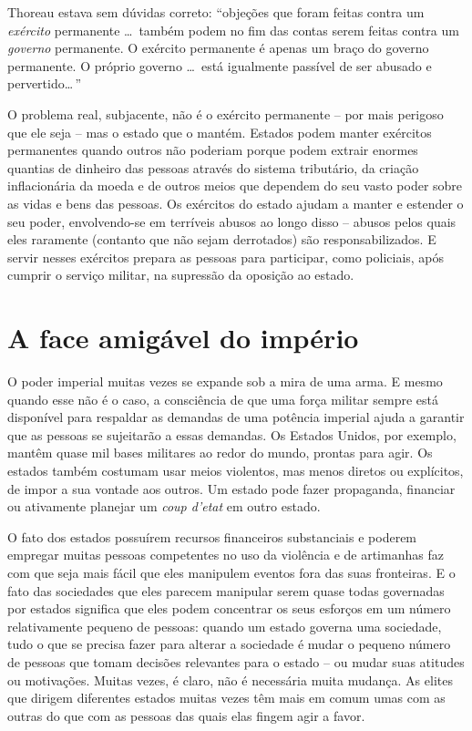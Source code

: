 Thoreau estava sem dúvidas correto: ``objeções que foram feitas contra um \emph{exército} permanente \ldots\ também podem no fim das contas serem feitas contra um \emph{governo} permanente. O exército permanente é apenas um braço do governo permanente. O próprio governo \ldots\ está igualmente passível de ser abusado e pervertido\ldots\,''

O problema real, subjacente, não é o exército permanente -- por mais perigoso que ele seja -- mas o estado que o mantém. Estados podem manter exércitos permanentes quando outros não poderiam porque podem extrair enormes quantias de dinheiro das pessoas através do sistema tributário, da criação inflacionária da moeda e de outros meios que dependem do seu vasto poder sobre as vidas e bens das pessoas. Os exércitos do estado ajudam a manter e estender o seu poder, envolvendo-se em terríveis abusos ao longo disso -- abusos pelos quais eles raramente (contanto que não sejam derrotados) são responsabilizados. E servir nesses exércitos prepara as pessoas para participar, como policiais, após cumprir o serviço militar, na supressão da oposição ao estado.

\section{A face amigável do império}

O poder imperial muitas vezes se expande sob a mira de uma arma. E mesmo quando esse não é o caso, a consciência de que uma força militar sempre está disponível para respaldar as demandas de uma potência imperial ajuda a garantir que as pessoas se sujeitarão a essas demandas. Os Estados Unidos, por exemplo, mantêm quase mil bases militares ao redor do mundo, prontas para agir. Os estados também costumam usar meios violentos, mas menos diretos ou explícitos, de impor a sua vontade aos outros. Um estado pode fazer propaganda, financiar ou ativamente planejar um \emph{coup d'etat} em outro estado.

O fato dos estados possuírem recursos financeiros substanciais e poderem empregar muitas pessoas competentes no uso da violência e de artimanhas faz com que seja mais fácil que eles manipulem eventos fora das suas fronteiras. E o fato das sociedades que eles parecem manipular serem quase todas governadas por estados significa que eles podem concentrar os seus esforços em um número relativamente pequeno de pessoas: quando um estado governa uma sociedade, tudo o que se precisa fazer para alterar a sociedade é mudar o pequeno número de pessoas que tomam decisões relevantes para o estado -- ou mudar suas atitudes ou motivações. Muitas vezes, é claro, não é necessária muita mudança. As elites que dirigem diferentes estados muitas vezes têm mais em comum umas com as outras do que com as pessoas das quais elas fingem agir a favor.

